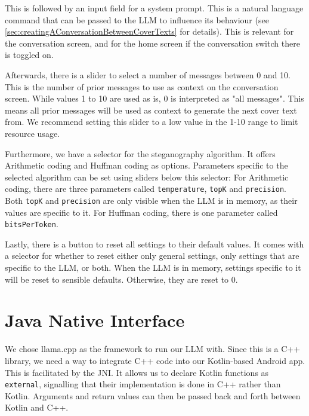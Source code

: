 This is followed by an input field for a system prompt. This is a natural language command that can be passed to the \gls{LLM} to influence its behaviour (see \cref{sec:creatingAConversationBetweenCoverTexts} for details). This is relevant for the conversation screen, and for the home screen if the conversation switch there is toggled on.

Afterwards, there is a slider to select a number of messages between 0 and 10. This is the number of prior messages to use as context on the conversation screen. While values 1 to 10 are used as is, 0 is interpreted as "all messages". This means all prior messages will be used as context to generate the next cover text from. We recommend setting this slider to a low value in the 1-10 range to limit resource usage.

Furthermore, we have a selector for the steganography algorithm. It offers Arithmetic coding and Huffman coding as options. Parameters specific to the selected algorithm can be set using sliders below this selector: For Arithmetic coding, there are three parameters called \lstinline|temperature|, \lstinline|topK| and \lstinline|precision|. Both \lstinline|topK| and \lstinline|precision| are only visible when the \gls{LLM} is in memory, as their values are specific to it. For Huffman coding, there is one parameter called \lstinline|bitsPerToken|.

Lastly, there is a button to reset all settings to their default values. It comes with a selector for whether to reset either only general settings, only settings that are specific to the \gls{LLM}, or both. When the \gls{LLM} is in memory, settings specific to it will be reset to sensible defaults. Otherwise, they are reset to 0.

\section{Java Native Interface}
\label{sec:javaNativeInterface}
We chose llama.cpp as the framework to run our \gls{LLM} with. Since this is a C++ library, we need a way to integrate C++ code into our Kotlin-based Android app. This is facilitated by the \gls{JNI}. It allows us to declare Kotlin functions as \lstinline|external|, signalling that their implementation is done in C++ rather than Kotlin. Arguments and return values can then be passed back and forth between Kotlin and C++.

\vspace{0.25cm}


